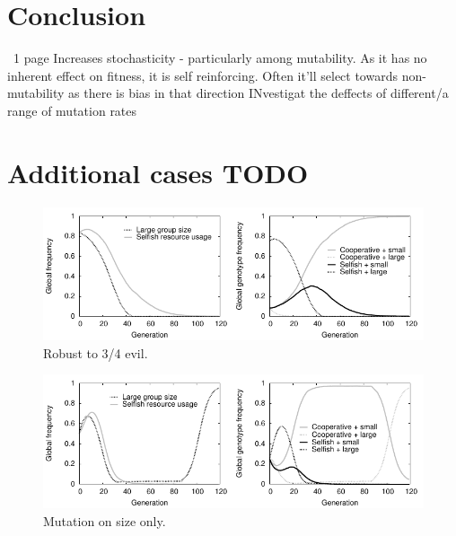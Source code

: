 \documentclass[11pt]{article}
\begin{document}
\section{Conclusion}
~1 page
Increases stochasticity - particularly among mutability. As it has no inherent effect on fitness, it is self reinforcing. Often it'll select towards non-mutability as there is bias in that direction
INvestigat the deffects of different/a range of mutation rates


{}


\newpage
\appendix
\section{Additional cases TODO}
\begin{figure}[!ht]
  \centering
  \includegraphics{unevenplot.pdf}
  \caption{Robust to 3/4 evil.}
  \label{fig:unevenplot}
\end{figure}

\begin{figure}[!ht]
  \centering
  \includegraphics{sizeplot.pdf}
  \caption{Mutation on size only.}
  \label{fig:sizeplot}
\end{figure}
\end{document}
